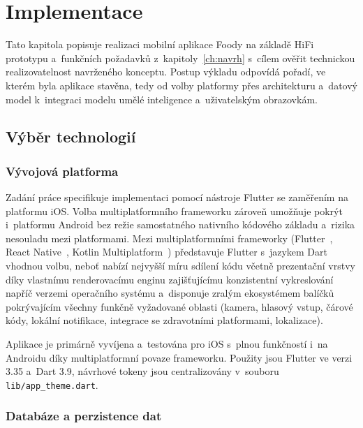 \chapter{Implementace}
\label{ch:implementace}

Tato kapitola popisuje realizaci mobilní aplikace Foody na základě HiFi prototypu a~funkčních požadavků z~kapitoly~\ref{ch:navrh} s~cílem ověřit technickou realizovatelnost navrženého konceptu.
Postup výkladu odpovídá pořadí, ve kterém byla aplikace stavěna, tedy od volby platformy přes architekturu a~datový model k~integraci modelu umělé inteligence a~uživatelským obrazovkám.

\section{Výběr technologií}
\label{sec:vyberTechnologii}

\subsection{Vývojová platforma}
\label{subsec:vyvojovaPlatforma}

Zadání práce specifikuje implementaci pomocí nástroje Flutter se zaměřením na platformu iOS.
Volba multiplatformního frameworku zároveň umožňuje pokrýt i~platformu Android bez režie samostatného nativního kódového základu a~rizika nesouladu mezi platformami.
Mezi multiplatformními frameworky (Flutter~\cite{flutterDoc}, React Native~\cite{reactNativeDoc}, Kotlin Multiplatform~\cite{kotlinMultiplatformDoc}) představuje Flutter s~jazykem Dart vhodnou volbu, neboť nabízí nejvyšší míru sdílení kódu včetně prezentační vrstvy díky vlastnímu renderovacímu enginu zajišťujícímu konzistentní vykreslování napříč verzemi operačního systému a~disponuje zralým ekosystémem balíčků pokrývajícím všechny funkčně vyžadované oblasti (kamera, hlasový vstup, čárové kódy, lokální notifikace, integrace se zdravotními platformami, lokalizace).

Aplikace je primárně vyvíjena a~testována pro iOS s~plnou funkčností i~na Androidu díky multiplatformní povaze frameworku.
Použity jsou Flutter ve verzi 3.35 a~Dart 3.9, návrhové tokeny jsou centralizovány v~souboru \texttt{lib/app\_theme.dart}.

\subsection{Databáze a perzistence dat}
\label{subsec:databaze}

